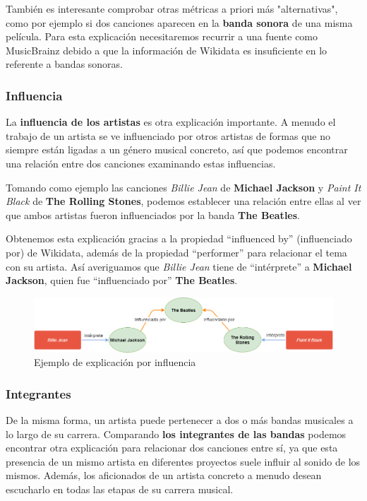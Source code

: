 También es interesante comprobar otras métricas a priori más "alternativas", como por ejemplo si dos canciones aparecen en la \textbf{banda sonora} de una misma película. Para esta explicación necesitaremos recurrir a una fuente como MusicBrainz debido a que la información de Wikidata es insuficiente en lo referente a bandas sonoras.

\subsubsection*{Influencia}

La \textbf{influencia de los artistas} es otra explicación importante. A menudo el trabajo de un artista se ve influenciado por otros artistas de formas que no siempre están ligadas a un género musical concreto, así que podemos encontrar una relación entre dos canciones examinando estas influencias.

Tomando como ejemplo las canciones \textit{Billie Jean} de \textbf{Michael Jackson} y \textit{Paint It Black} de \textbf{The Rolling Stones}, podemos establecer una relación entre ellas al ver que ambos artistas fueron influenciados por la banda \textbf{The Beatles}.

Obtenemos esta explicación gracias a la propiedad ``influenced by'' (influenciado por) de Wikidata, además de la propiedad ``performer'' para relacionar el tema con su artista. Así averiguamos que \textit{Billie Jean} tiene de ``intérprete'' a \textbf{Michael Jackson}, quien fue ``influenciado por'' \textbf{The Beatles}.

\begin{figure}[h!]
	\centering
	\includegraphics[width = 1\textwidth]{Imagenes/Bitmap/Influencia ejemplo.png}
	\caption{Ejemplo de explicación por influencia}
	\label{fig:sampleImage}
\end{figure}

\subsubsection*{Integrantes}

De la misma forma, un artista puede pertenecer a dos o más bandas musicales a lo largo de su carrera. Comparando \textbf{los integrantes de las bandas} podemos encontrar otra explicación para relacionar dos canciones entre sí, ya que esta presencia de un mismo artista en diferentes proyectos suele influir al sonido de los mismos. Además, los aficionados de un artista concreto a menudo desean escucharlo en todas las etapas de su carrera musical.


